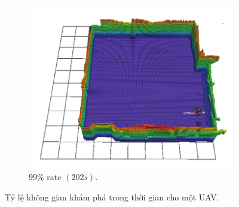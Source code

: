 \documentclass[11pt,openany]{book}
\begin{document}
\begin{figure}[H]
\begin{subfigure}[H]{0.3\linewidth}
        \label{fig:3.13i}
    \end{subfigure}
    \begin{subfigure}[H]{0.3\linewidth}
        \includegraphics[width=\linewidth]{assets/3_13_j.png}
        \caption{{$99\%$ rate $(202s).$}}
        \label{fig:3.13j}
    \end{subfigure}
    \caption{Tỷ lệ không gian khám phá trong thời gian cho một UAV.}
    \label{fig:3.13}
\end{figure}
\end{document}
